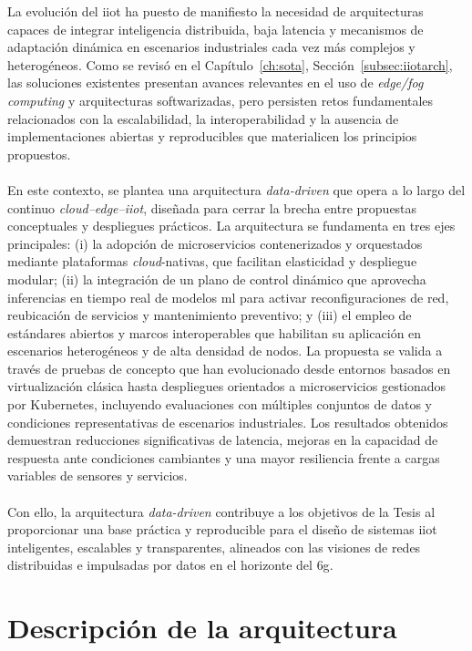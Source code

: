 La evolución del \gls{iiot} ha puesto de manifiesto la necesidad de arquitecturas capaces de integrar inteligencia distribuida, baja latencia y mecanismos de adaptación dinámica en escenarios industriales cada vez más complejos y heterogéneos. Como se revisó en el Capítulo~\ref{ch:sota}, Sección~\ref{subsec:iiotarch}, las soluciones existentes presentan avances relevantes en el uso de \textit{edge/fog computing} y arquitecturas softwarizadas, pero persisten retos fundamentales relacionados con la escalabilidad, la interoperabilidad y la ausencia de implementaciones abiertas y reproducibles que materialicen los principios propuestos.\\
\\
En este contexto, se plantea una arquitectura \textit{data-driven} que opera a lo largo del continuo \textit{cloud–edge–\gls{iiot}}, diseñada para cerrar la brecha entre propuestas conceptuales y despliegues prácticos. La arquitectura se fundamenta en tres ejes principales: (i) la adopción de microservicios contenerizados y orquestados mediante plataformas \textit{cloud}-nativas, que facilitan elasticidad y despliegue modular; (ii) la integración de un plano de control dinámico que aprovecha inferencias en tiempo real de modelos \gls{ml} para activar reconfiguraciones de red, reubicación de servicios y mantenimiento preventivo; y (iii) el empleo de estándares abiertos y marcos interoperables que habilitan su aplicación en escenarios heterogéneos y de alta densidad de nodos. La propuesta se valida a través de pruebas de concepto que han evolucionado desde entornos basados en virtualización clásica hasta despliegues orientados a microservicios gestionados por Kubernetes, incluyendo evaluaciones con múltiples conjuntos de datos y condiciones representativas de escenarios industriales. Los resultados obtenidos demuestran reducciones significativas de latencia, mejoras en la capacidad de respuesta ante condiciones cambiantes y una mayor resiliencia frente a cargas variables de sensores y servicios.\\
\\
Con ello, la arquitectura \textit{data-driven} contribuye a los objetivos de la Tesis al proporcionar una base práctica y reproducible para el diseño de sistemas \gls{iiot} inteligentes, escalables y transparentes, alineados con las visiones de redes distribuidas e impulsadas por datos en el horizonte del \gls{6g}.

\section{Descripción de la arquitectura}
\label{sec:system}

